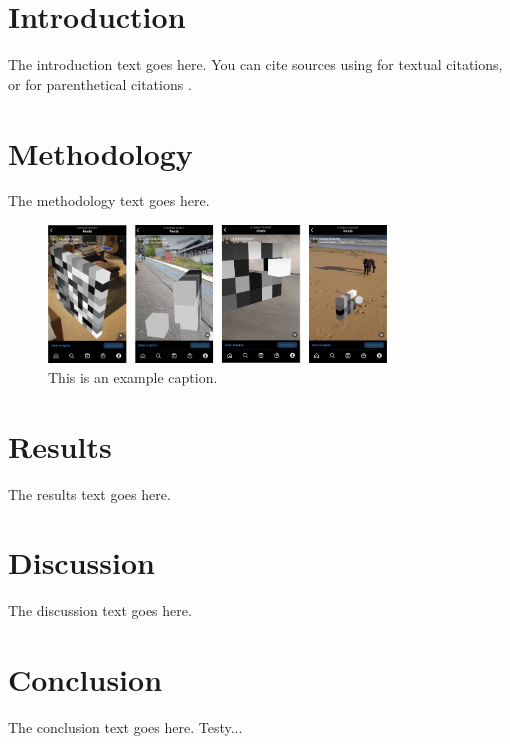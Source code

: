 \section*{Introduction}
The introduction text goes here. You can cite sources using \textcite{RindCmplxtyAndClmt1999} for textual citations, or \parencite{RindCmplxtyAndClmt1999} for parenthetical citations \parencite[see][p.35]{Bell_PhilosophyAtTheEdgeOfChaos_2006}.

\section*{Methodology}
The methodology text goes here.

\begin{figure}[htb]
    \centering
    \includegraphics[width=0.8\textwidth]{figures/algorithms-1.png}  %
    \caption{This is an example caption.}
    \label{fig:exampleFigure}
  \end{figure}

\section*{Results}
The results text goes here.

\section*{Discussion}
The discussion text goes here.

\section*{Conclusion}
The conclusion text goes here. Testy...
